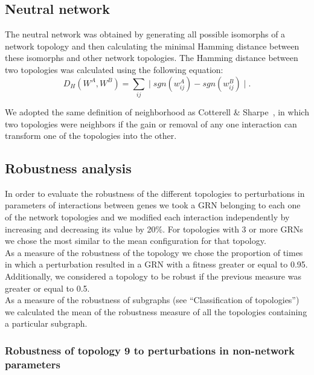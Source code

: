 \documentclass[10pt,letterpaper]{article}
\begin{document}
\subsection*{Neutral network}

The neutral network was obtained by generating all possible isomorphs of a
network topology and then calculating the minimal Hamming distance between these
isomorphs and other network topologies. The Hamming distance between two
topologies was calculated using the following equation:
\begin{equation}
 D_H(W^A, W^B) = \sum_{ij} \mid sgn(w_{ij}^A) - sgn(w^B_{ij}) \mid .
\end{equation}

We adopted the same definition of neighborhood as Cotterell \&
Sharpe~\cite{Cotterell2010}, in which two topologies were neighbors if the gain or
removal of any one interaction can transform one of the topologies into the
other.

\subsection*{Robustness analysis}

In order to evaluate the robustness of the different topologies to perturbations
in parameters of interactions between genes we took a GRN belonging to each one
of the network topologies and we modified each interaction independently by
increasing and decreasing its value by 20\%. For topologies with 3 or more
GRNs we chose the most similar to the mean configuration for that topology.\\

As a measure of the robustness of the topology we chose the proportion of times
in which a perturbation resulted in a GRN with a fitness greater or equal to
0.95. Additionally, we considered a topology to be robust if the previous
measure was greater or equal to 0.5.\\

As a measure of the robustness of subgraphs (see “Classification of topologies”)
we calculated the mean of the robustness measure of all the topologies
containing a particular subgraph.\\

\subsubsection*{Robustness of topology 9 to perturbations in non-network parameters}
\end{document}
